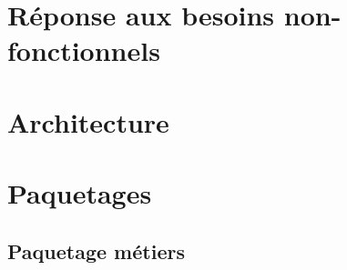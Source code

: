 \section{Réponse aux besoins non-fonctionnels}


\section{Architecture}


\section{Paquetages}


\clearpage
\subsection{Paquetage métiers}
\label{section_metiers}


